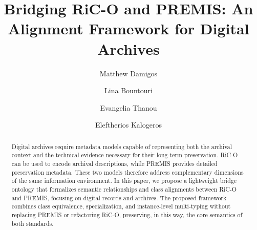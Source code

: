\documentclass[runningheads]{llncs}
\begin{document}
%
\title{Bridging RiC-O and PREMIS: An Alignment Framework for Digital Archives}
%
%
\author{Matthew Damigos\and 
Lina Bountouri\and 
Evangelia Thanou\and 
Eleftherios Kalogeros
}
%
%
%
\maketitle              %
%
\begin{abstract}
	Digital archives require metadata models capable of representing both the archival context and the technical evidence necessary for their long-term preservation. RiC-O can be used to encode archival descriptions, while PREMIS provides detailed preservation metadata. These two models therefore address complementary dimensions of the same information environment. In this paper, we propose a lightweight bridge ontology that formalizes semantic relationships and class alignments between RiC-O and PREMIS, focusing on digital records and archives. The proposed framework combines class equivalence, specialization, and instance-level multi-typing without replacing PREMIS or refactoring RiC-O, preserving, in this way, the core semantics of both standards. 
\end{abstract}
%
%
%
\end{document}
